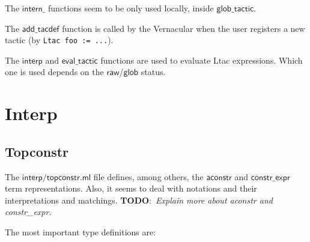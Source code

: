 \documentclass[a4paper,oneside]{book}
\newcommand{\m}[1]{\ensuremath{\mathsf{#1}}}
\newcommand{\TODO}[1]{\textbf{TODO}:\ \emph{#1}}
\begin{document}
\noindent
The \m{intern\_} functions seem to be only used locally, inside
\m{glob\_tactic}.

The \m{add\_tacdef} function is called by the Vernacular when the user
registers a new tactic (by \verb|Ltac foo := ...|).

The \m{interp} and \m{eval\_tactic} functions are used to evaluate
Ltac expressions. Which one is used depends on the \m{raw}/\m{glob}
status.

\newpage

\section{Interp}

\subsection{Topconstr}

The \m{interp/topconstr.ml} file defines, among others, the
\m{aconstr} and \m{constr\_expr} term representations. Also, it seems
to deal with notations and their interpretations and
matchings. \TODO{Explain more about aconstr and constr\_expr}.

The most important type definitions are:
\end{document}
